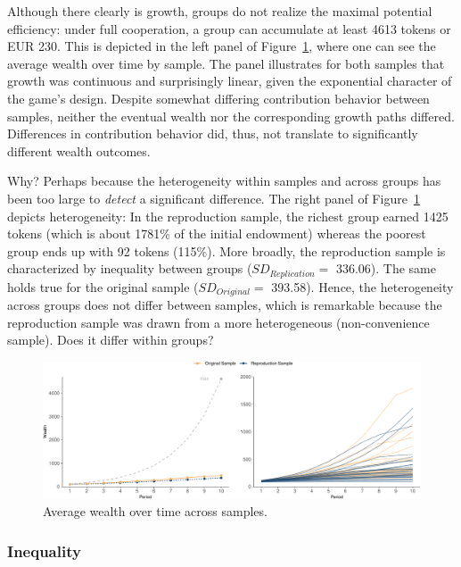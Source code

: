 \documentclass[
  authoryear,
  preprint,
  3p]{elsarticle}
\begin{document}
Although there clearly is growth, groups do not realize the maximal
potential efficiency: under full cooperation, a group can accumulate at
least 4613 tokens or EUR 230. This is depicted in the left panel of
Figure~\ref{fig-growth-heterogeneity}, where one can see the average
wealth over time by sample. The panel illustrates for both samples that
growth was continuous and surprisingly linear, given the exponential
character of the game's design. Despite somewhat differing contribution
behavior between samples, neither the eventual wealth nor the
corresponding growth paths differed. Differences in contribution
behavior did, thus, not translate to significantly different wealth
outcomes.

Why? Perhaps because the heterogeneity within samples and across groups
has been too large to \emph{detect} a significant difference. The right
panel of Figure~\ref{fig-growth-heterogeneity} depicts heterogeneity: In
the reproduction sample, the richest group earned 1425 tokens (which is
about 1781\% of the initial endowment) whereas the poorest group ends up
with 92 tokens (115\%). More broadly, the reproduction sample is
characterized by inequality between groups (\(SD_{Replication} =\)
336.06). The same holds true for the original sample
(\(SD_{Original} =\) 393.58). Hence, the heterogeneity across groups
does not differ between samples, which is remarkable because the
reproduction sample was drawn from a more heterogeneous (non-convenience
sample). Does it differ within groups?

\begin{figure}

{\centering \includegraphics{paper_files/figure-pdf/fig-growth-heterogeneity-1.pdf}

}

\caption{\label{fig-growth-heterogeneity}Average wealth over time across
samples.}

\end{figure}

\hypertarget{sec-inequality}{%
\subsubsection{Inequality}\label{sec-inequality}}
\end{document}
